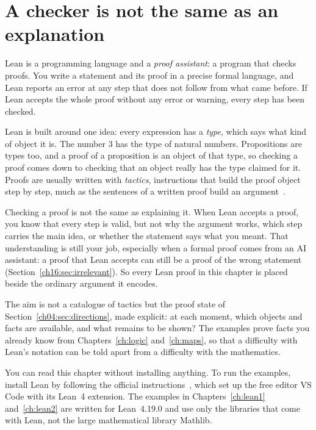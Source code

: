 \section{A checker is not the same as an explanation}\label{ch15:sec:checker}
Lean is a programming language and a \emph{proof assistant}: a program that checks proofs. You write a statement and its proof in a precise formal language, and Lean reports an error at any step that does not follow from what came before. If Lean accepts the whole proof without any error or warning, every step has been checked.

Lean is built around one idea: every expression has a \emph{type}, which says what kind of object it is. The number $3$ has the type of natural numbers. Propositions are types too, and a proof of a proposition is an object of that type, so checking a proof comes down to checking that an object really has the type claimed for it. Proofs are usually written with \emph{tactics}, instructions that build the proof object step by step, much as the sentences of a written proof build an argument~\cite{leanprop,leantactics}.

Checking a proof is not the same as explaining it. When Lean accepts a proof, you know that every step is valid, but not why the argument works, which step carries the main idea, or whether the statement says what you meant. That understanding is still your job, especially when a formal proof comes from an AI assistant: a proof that Lean accepts can still be a proof of the wrong statement (Section~\ref{ch16:sec:irrelevant}). So every Lean proof in this chapter is placed beside the ordinary argument it encodes.

The aim is not a catalogue of tactics but the proof state of Section~\ref{ch04:sec:directions}, made explicit: at each moment, which objects and facts are available, and what remains to be shown? The examples prove facts you already know from Chapters~\ref{ch:logic} and~\ref{ch:maps}, so that a difficulty with Lean's notation can be told apart from a difficulty with the mathematics.

You can read this chapter without installing anything. To run the examples, install Lean by following the official instructions~\cite{leaninstall}, which set up the free editor VS Code with its Lean~4 extension. The examples in Chapters~\ref{ch:lean1} and~\ref{ch:lean2} are written for Lean~4.19.0 and use only the libraries that come with Lean, not the large mathematical library Mathlib.

